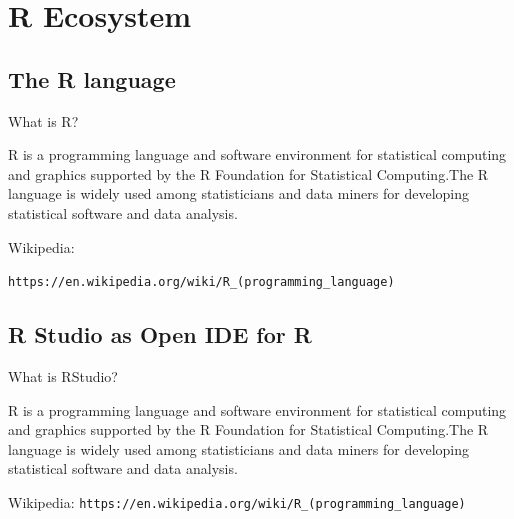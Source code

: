 \documentclass{beamer}
\begin{document}


\section{R Ecosystem}


\subsection[R language]{The R language}


\begin{frame}{What is R?} %

R is a programming language and software environment for statistical computing and graphics supported by the R Foundation for Statistical Computing.The R language is widely used among statisticians and data miners for developing statistical software and data analysis.

Wikipedia: 

\begin{footnotesize}
\texttt{https://en.wikipedia.org/wiki/R\_(programming\_language)}                                                                 \end{footnotesize}


\end{frame}


\subsection[R Studio]{R Studio as Open IDE for R}


\begin{frame}{What is RStudio?} %

R is a programming language and software environment for statistical computing and graphics supported by the R Foundation for Statistical Computing.The R language is widely used among statisticians and data miners for developing statistical software and data analysis.

Wikipedia: \texttt{https://en.wikipedia.org/wiki/R\_(programming\_language)}
\end{frame}
\end{document}
